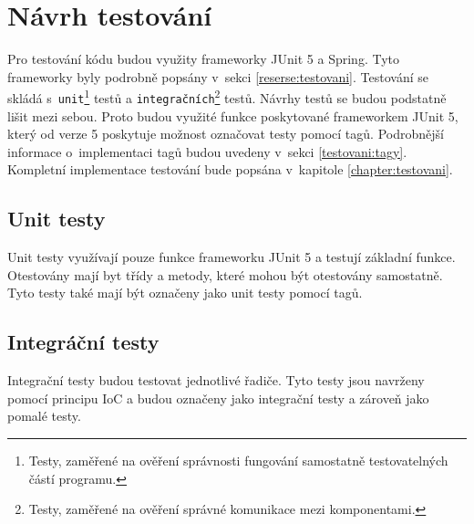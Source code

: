     
\section{Návrh testování}\label{navrh:testovani}
    Pro testování kódu budou využity frameworky JUnit 5 a Spring. Tyto frameworky byly podrobně popsány v~sekci \ref{reserse:testovani}. Testování se skládá s~\texttt{unit}\footnote{Testy, zaměřené na ověření správnosti fungování samostatně testovatelných částí programu.} testů a \texttt{integračních}\footnote{Testy, zaměřené na ověření správné komunikace mezi komponentami.} testů. Návrhy testů se budou podstatně lišit mezi sebou. Proto budou využité funkce poskytované frameworkem JUnit 5, který od verze 5 poskytuje možnost označovat testy pomocí tagů\cite{junit-tags}. Podrobnější informace o~implementaci tagů budou uvedeny v~sekci \ref{testovani:tagy}. Kompletní implementace testování bude popsána v~kapitole \ref{chapter:testovani}.
    
    \subsection{Unit testy}
        Unit testy využívají pouze funkce frameworku JUnit 5 a testují základní funkce. Otestovány mají byt třídy a metody, které mohou být otestovány samostatně. Tyto testy také mají být označeny jako unit testy pomocí tagů.  %
        
    \subsection{Integráční testy}
        Integrační testy budou testovat jednotlivé řadiče. Tyto testy jsou navrženy pomocí principu IoC a budou označeny jako integrační testy a zároveň jako pomalé testy.
